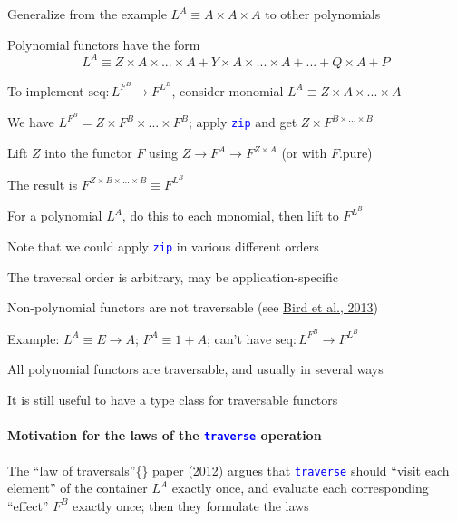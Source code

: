 \vspace{-0.1cm}Generalize from the example $L^{A}\equiv A\times A\times A$
to other polynomials

Polynomial functors have the form {\small{}
\[
L^{A}\equiv Z\times A\times...\times A+Y\times A\times...\times A+...+Q\times A+P
\]
}{\small\par}

To implement {\small{}$\text{seq}:L^{F^{B}}\rightarrow F^{L^{B}}$},
consider monomial {\small{}$L^{A}\equiv Z\times A\times...\times A$}{\small\par}

We have $L^{F^{B}}=Z\times F^{B}\times...\times F^{B}$; apply \texttt{\textcolor{blue}{\footnotesize{}zip}}
and get $Z\times F^{B\times...\times B}$ 

Lift $Z$ into the functor $F$ using $Z\rightarrow F^{A}\rightarrow F^{Z\times A}$
(or with $F.\text{pure}$)

The result is $F^{Z\times B\times...\times B}\equiv F^{L^{B}}$

For a polynomial $L^{A}$, do this to each monomial, then lift to
$F^{L^{B}}$

Note that we could apply \texttt{\textcolor{blue}{\footnotesize{}zip}}
in various different orders

The traversal order is arbitrary, may be application-specific

Non-polynomial functors are not traversable (see \href{http://www.cs.ox.ac.uk/jeremy.gibbons/publications/uitbaf.pdf}{Bird et al., 2013})

Example: $L^{A}\equiv E\rightarrow A$; $F^{A}\equiv1+A$; can't have
{\small{}$\text{seq}:L^{F^{B}}\rightarrow F^{L^{B}}$}{\small\par}

All polynomial functors are traversable, and usually in several ways

It is still useful to have a type class for traversable functors


\paragraph{Motivation for the laws of the \texttt{\textcolor{blue}{\footnotesize{}traverse}}
operation}

\vspace{-0.2cm}The \href{https://arxiv.org/pdf/1202.2919.pdf}{\textquotedblleft law of traversals\textquotedblright\{\} paper}
(2012) argues that \texttt{\textcolor{blue}{\footnotesize{}traverse}}
should ``visit each element'' of the container $L^{A}$ exactly
once, and evaluate each corresponding ``effect'' $F^{B}$ exactly
once; then they formulate the laws

